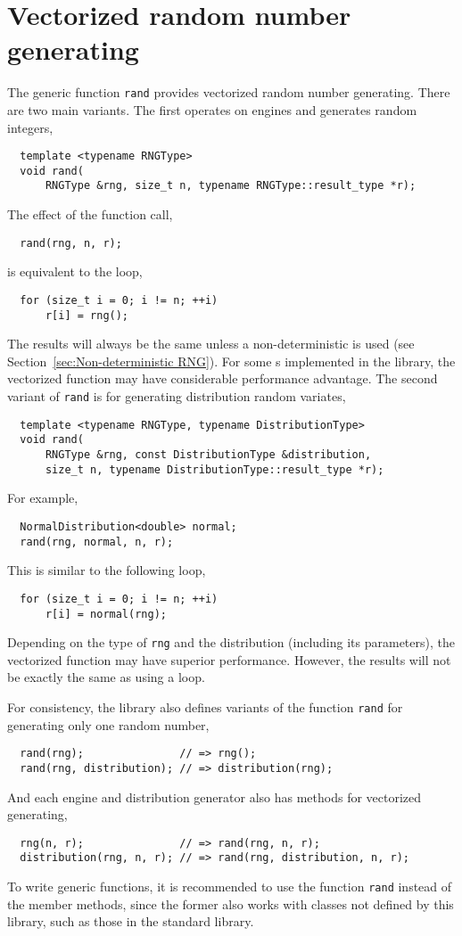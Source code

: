 \section{Vectorized random number generating}
\label{sec:Vectorized random number generating}

The generic function \verb|rand| provides vectorized random number generating.
There are two main variants. The first operates on \rng engines and generates
random integers,
\begin{Verbatim}
  template <typename RNGType>
  void rand(
      RNGType &rng, size_t n, typename RNGType::result_type *r);
\end{Verbatim}
The effect of the function call,
\begin{Verbatim}
  rand(rng, n, r);
\end{Verbatim}
is equivalent to the loop,
\begin{Verbatim}
  for (size_t i = 0; i != n; ++i)
      r[i] = rng();
\end{Verbatim}
The results will always be the same unless a non-deterministic \rng is used
(see Section~\ref{sec:Non-deterministic RNG}). For some \rng{}s implemented in
the library, the vectorized function may have considerable performance
advantage. The second variant of \verb|rand| is for generating distribution
random variates,
\begin{Verbatim}
  template <typename RNGType, typename DistributionType>
  void rand(
      RNGType &rng, const DistributionType &distribution,
      size_t n, typename DistributionType::result_type *r);
\end{Verbatim}
For example,
\begin{Verbatim}
  NormalDistribution<double> normal;
  rand(rng, normal, n, r);
\end{Verbatim}
This is similar to the following loop,
\begin{Verbatim}
  for (size_t i = 0; i != n; ++i)
      r[i] = normal(rng);
\end{Verbatim}
Depending on the type of \verb|rng| and the distribution (including its
parameters), the vectorized function may have superior performance. However,
the results will not be exactly the same as using a loop.

For consistency, the library also defines variants of the function \verb|rand|
for generating only one random number,
\begin{Verbatim}
  rand(rng);               // => rng();
  rand(rng, distribution); // => distribution(rng);
\end{Verbatim}
And each \rng engine and distribution generator also has methods for vectorized
generating,
\begin{Verbatim}
  rng(n, r);               // => rand(rng, n, r);
  distribution(rng, n, r); // => rand(rng, distribution, n, r);
\end{Verbatim}
To write generic functions, it is recommended to use the function \verb|rand|
instead of the member methods, since the former also works with classes not
defined by this library, such as those in the standard library.

